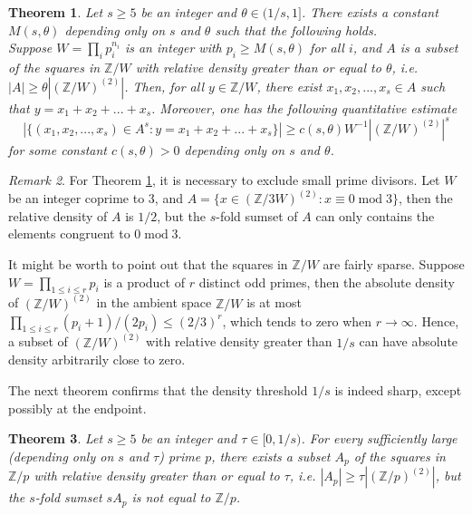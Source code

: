 \documentclass[11pt]{amsart}
\theoremstyle{plain} %
\newtheorem{thm}{Theorem}[section]
\theoremstyle{remark}
\newtheorem{rem}[thm]{Remark}
\numberwithin{equation}{section}
\newcommand{\Z}{\mathbb{Z}}
\begin{document}
\begin{thm}\label{main}
    Let $s\geq 5$ be an integer and $\theta\in (1/s,1]$. There exists a constant $M(s,\theta)$ depending only on $s$ and $\theta$ such that the following holds.\\

    Suppose $W=\prod_{i} p_i^{n_i}$ is an integer with $p_i\geq M(s,\theta)$ for all $i$, and $A$ is a subset of the squares in $\mathbb{Z}/W$ with relative density greater than or equal to $\theta$, i.e. $|A|\geq\theta |(\mathbb{Z}/W)^{(2)}|$. Then, for all $y\in \mathbb{Z}/W$, there exist $x_1,x_2,...,x_s\in A$ such that $y=x_1+x_2+...+x_s$. Moreover, one has the following quantitative estimate
    \begin{equation*}
        |\{ (x_1,x_2,...,x_s)\in A^s:y=x_1+x_2+...+x_s\}|\geq c(s,\theta)W^{-1} |(\mathbb{Z}/W)^{(2)}|^s
    \end{equation*}
    for some constant $c(s,\theta)>0$ depending only on $s$ and $\theta$.
\end{thm}

\begin{rem}
    For Theorem \ref{main}, it is necessary to exclude small prime divisors. Let $W$ be an integer coprime to $3$, and $A=\{x\in (\Z/3W)^{(2)}:x\equiv 0\;\mathrm{mod}\;3\}$, then the relative density of $A$ is $1/2$, but the $s$-fold sumset of $A$ can only contains the elements congruent to $0\;\mathrm{mod}\;3$.
\end{rem}

It might be worth to point out that the squares in $\Z/W$ are fairly sparse. Suppose $W=\prod_{1\leq i\leq r}p_i$ is a product of $r$ distinct odd primes, then the absolute density of $(\Z/W)^{(2)}$ in the ambient space $\Z/W$ is at most $\prod_{1\leq i\leq r}(p_i+1)/(2p_i)\leq (2/3)^r$, which tends to zero when $r\rightarrow\infty$. Hence, a subset of $(\Z/W)^{(2)}$ with relative density greater than $1/s$ can have absolute density arbitrarily close to zero.

The next theorem confirms that the density threshold $1/s$ is indeed sharp, except possibly at the endpoint.

\begin{thm}\label{counter examples}
    Let $s\geq 5$ be an integer and $\tau\in [0,1/s)$. For every sufficiently large (depending only on $s$ and $\tau$) prime $p$, there exists a subset $A_p$ of the squares in $\mathbb{Z}/p$ with relative density greater than or equal to $\tau$, i.e. $|A_p|\geq \tau|(\mathbb{Z}/p)^{(2)}|$, but the $s$-fold sumset $sA_p$ is not equal to $\mathbb{Z}/p$.  
\end{thm}
\end{document}
